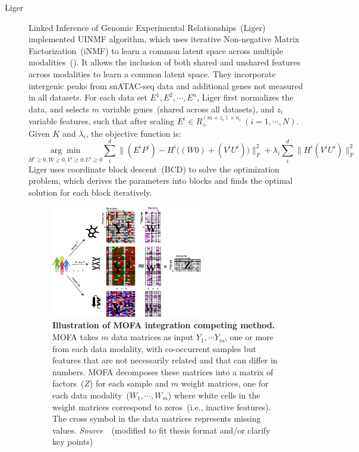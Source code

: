 \begin{description}
  \item[Liger]
  Linked Inference of Genomic Experimental Relationships~(Liger)~\citep{kriebel2022uinmf} implemented UINMF algorithm, which uses iterative Non-negative Matrix Factorization~(iNMF) to learn a common latent space across multiple modalities~(). It allows the inclusion of both shared and unshared features across modalities to learn a common latent space. They incorporate intergenic peaks from snATAC-seq data and additional genes not measured in all datasets. For each data set $E^1, E^2, \cdots, E^n$, Liger first normalizes the data, and selects $m$ variable genes~(shared across all datasets), and $z_i$ variable features, such that after scaling $E^i \in R_{+}^{(m+z_i)\times n_i}\ (i=1,\cdots,N)$. Given $K$ and $\lambda_i$, the objective function is:
  \begin{equation}
	  \underset{H^i\geq 0,W\geq 0, V^i\geq 0, U^i \geq 0}{\arg\min} \sum_i^{d}\Big\| (E^i P^i) - H^i \big((W 0) + (V^i U^i)\big)\Big\|_{F}^2 + \lambda_i\sum_i^d\Big\|H^i(V^i U^i)\Big\|_{F}^2
  \end{equation}
  Liger uses coordinate block descent~(BCD) to solve the optimization problem, which derives the parameters into blocks and finds the optimal solution for each block iteratively.


\begin{figure}[!h]
  	\centering
  	\includegraphics[width=0.65\textwidth]{Alg_MOFA/fig}
  	\vspace{0.1cm}
  	\caption[Illustration of MOFA integration competing method.]{\textbf{Illustration of MOFA integration competing method.} MOFA takes $m$ data matrices as input $Y_1, \cdots Y_m$, one or more from each data modality, with co-occurrent samples but features that are not necessarily related and that can differ in numbers. MOFA decomposes these matrices into a matrix of factors~($Z$) for each sample and $m$ weight matrices, one for each data modality~($W_1,\cdots, W_m$) where white cells in the weight matrices correspond to zeros~(i.e., inactive features). The cross symbol in the data matrices represents missing values. \emph{Source~\cite{tewari2017mofa}}~(modified to fit thesis format and/or clarify key points)
  }
  	\label{fig:Alg_MOFA}
\end{figure}
 

\end{description}
